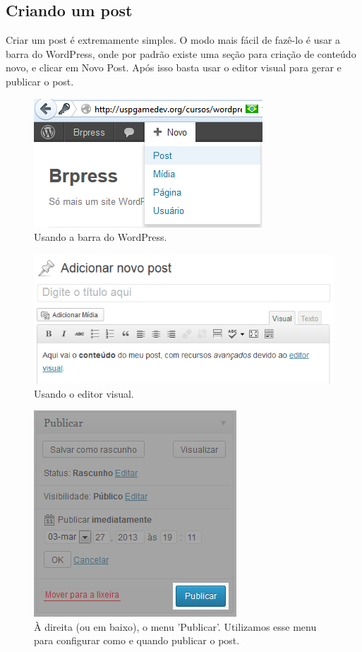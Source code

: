 \documentclass[12pt,onecolumn]{article}
\begin{document}
	\subsection{Criando um post}
		Criar um post é extremamente simples. O modo mais fácil de fazê-lo é usar a barra do WordPress,
		onde por padrão existe uma seção para criação de conteúdo novo, e clicar em Novo Post. Após isso
		basta usar o editor visual para gerar e publicar o post.
		\begin{figure}[H]
			\centering
			\includegraphics{post1.png}
			\caption{Usando a barra do WordPress.}
		\end{figure}
		\begin{figure}[H]
			\centering
			\includegraphics{post2.png}
			\caption{Usando o editor visual.}
		\end{figure}
		\begin{figure}[H]
			\centering
			\includegraphics{post3.png}
			\caption{À direita (ou em baixo), o menu 'Publicar'. Utilizamos esse menu para configurar como e quando publicar o post.}
		\end{figure}
\end{document}
